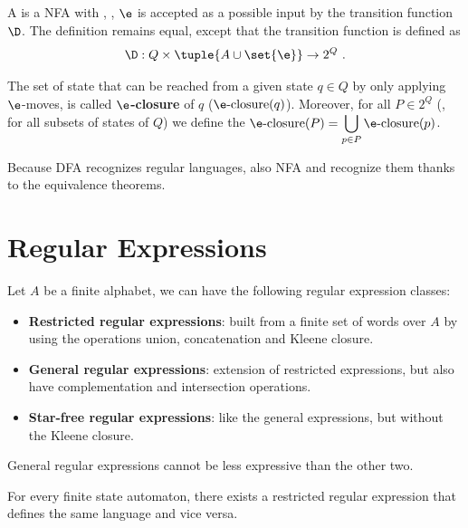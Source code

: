 \documentclass[oneside]{academica}
\begin{document}
\subsection{\eNFA}

A \eNFA is a NFA with , \ie, $\e$ is accepted as a possible input by the transition function $\D$.
The definition remains equal, except that the transition function is defined as
\begin{equation*}
  \D: Q \times \tuple{A \cup \set{\e}} \to 2^Q \ .
\end{equation*}

The set of state that can be reached from a given state $q \in Q$ by only applying $\e$-moves, is called $\boldsymbol{\e}$\textbf{-closure} of $q$ ($\e\text{-closure}(q)$).
Moreover, for all $P \in 2^Q$ (\ie, for all subsets of states of $Q$) we define the $\e\text{-closure}(P)=\displaystyle\bigcup_{p \in P} \e\text{-closure}(p)$.


Because DFA recognizes regular languages, also NFA and \eNFA recognize them thanks to the equivalence theorems.

\section{Regular Expressions}

Let $A$ be a finite alphabet, we can have the following regular expression classes:
\begin{itemize}
  \item \textbf{Restricted regular expressions}: built from a finite set of words over $A$ by using the operations union, concatenation and Kleene closure.
  \item \textbf{General regular expressions}: extension of restricted expressions, but also have complementation and intersection operations.
  \item \textbf{Star-free regular expressions}: like the general expressions, but without the Kleene closure.
\end{itemize}
General regular expressions cannot be less expressive than the other two.

\begin{theorem}\label{thm:fa_rre}
  For every finite state automaton, there exists a restricted regular expression that defines the same language and vice versa.
\end{theorem}
\end{document}
